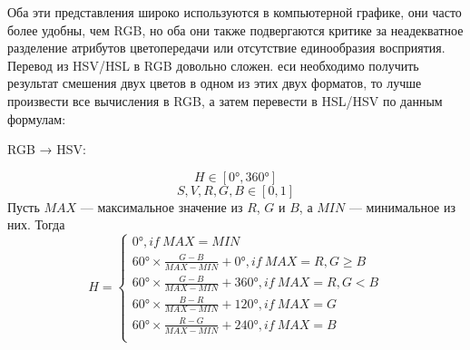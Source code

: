 \begin{figure}[ht!]
\end{figure}


Оба эти представления широко используются в компьютерной графике, они часто более удобны, чем RGB, но оба они также подвергаются критике за неадекватное разделение атрибутов цветопередачи или отсутствие единообразия восприятия. Перевод из HSV/HSL в RGB довольно сложен. еси  необходимо получить результат смешения двух цветов в одном из этих двух форматов, то лучше произвести все вычисления в RGB, а затем перевести в HSL/HSV по данным формулам: 

RGB → HSV: 

\begin{equation}
 H \in [0°, 360°] 
 \end{equation}
 \begin{equation}
 S,V,R,G,B \in [0,1]
\end{equation}
Пусть $MAX$ — максимальное значение из $R$, $G$ и $B$, а $MIN$ — минимальное из них. Тогда
\begin{equation}
H={\begin{cases} 0°,        if ~ MAX=MIN \\
	60°\times {\frac  {G-B}{MAX-MIN}}+0°, if~MAX=R, G\geq B \\
	60°\times {\frac  {G-B}{MAX-MIN}}+360°, if~MAX=R, G < B \\
	60°\times {\frac  {B-R}{MAX-MIN}}+120°, if~MAX=G \\
	60°\times {\frac  {R-G}{MAX-MIN}}+240°, if~ MAX= B \\
	\end{cases}}
\end{equation}

